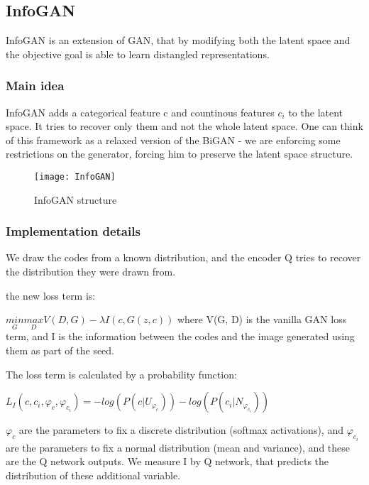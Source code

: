 \subsection{InfoGAN}

InfoGAN is an extension of GAN, that by modifying both the latent space and the objective goal is able to learn distangled representations.  

\subsubsection{Main idea}


InfoGAN adds a categorical feature c and countinous features $c_{i}$ to the latent space. It tries to recover only them and not the whole latent space. One can think of this framework as a relaxed version of the BiGAN - we are enforcing some restrictions on the generator, forcing him to preserve the latent space structure. 



\begin{figure}[h]
\centering
\texttt{[image: InfoGAN]}
\caption{InfoGAN structure \cite{14}}
\label{fig:x cubed graph}
\end{figure}



\subsubsection{Implementation details}


We draw the codes from a known distribution, and the encoder Q tries to recover the distribution they were drawn from. 

the new loss term is:

$\underset{G}{min}\underset{D}{max}V(D,G)- \lambda I(c,G(z,c))$
where V(G, D) is the vanilla GAN loss term, and I is the information between the codes and the image generated using them as part of the seed. 

The loss term is calculated by a probability function:

\centerline{$L_{I}(c, c_{i}, \varphi_{c}, \varphi_{c_{i}}) = -log(P(c|U_{\varphi_{c}})) -log(P(c_i|N_{\varphi_{c_i}}))$}

$\varphi_{c}$ are the parameters to fix a discrete distribution (softmax activations), and $\varphi_{c_{i}}$ are the parameters to fix a normal distribution (mean and variance), and these are the Q network outputs.
We measure I by Q network, that predicts the distribution of these additional variable.
 

